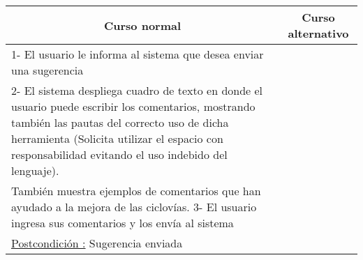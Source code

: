 \begin{center}
    \centering
    \begin{tabular}{ | p{11cm} | p{6cm} | }
    	\multicolumn{1}{c}{\cellcolor{black!30}\textbf{Curso normal}} & 
    	\multicolumn{1}{c}{\cellcolor{black!30}\textbf{Curso alternativo}} \\
		\hline
		1- El usuario le informa al sistema que desea enviar una sugerencia & \\ \hline
		2- El sistema despliega cuadro de texto en donde el usuario puede escribir los comentarios,
		mostrando también las pautas del correcto uso de dicha herramienta (Solicita
		utilizar el espacio con
		responsabilidad evitando el uso indebido del lenguaje). & \\ \hline
		También muestra ejemplos de comentarios que han ayudado a la mejora de las ciclovías.
		3- El usuario ingresa sus comentarios y los envía al sistema & \\ \hline
		\underline{Postcondición :} Sugerencia enviada & \\ \hline
    \end{tabular}
\end{center}




